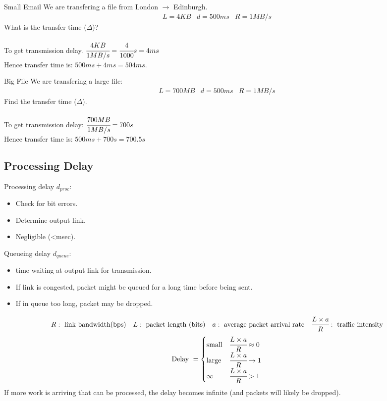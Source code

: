 \begin{examplebox}{Small Email}
    We are transfering a file from London $\to$ Edinburgh.
    \[\begin{matrix}
            L = 4KB & d = 500ms & R = 1MB/s
        \end{matrix}\]
    What is the transfer time ($\Delta$)?
    \\
    \\ To get transmission delay. $\cfrac{4KB}{1MB/s} = \cfrac{4}{1000}s = 4ms$
    \\ Hence transfer time is: $500ms + 4ms = 504ms$.
\end{examplebox}
\begin{examplebox}{Big File}
    We are transfering a large file:
    \[\begin{matrix}
            L = 700MB & d = 500ms & R = 1MB/s
        \end{matrix}\]
    Find the transfer time ($\Delta$).
    \\
    \\ To get transmission delay: $\cfrac{700MB}{1MB/s} = 700s$
    \\ Hence transfer time is: $500ms + 700s = 700.5s$
\end{examplebox}

\subsection{Processing Delay}
Processing delay $d_{proc}$:
\begin{itemize}
    \setlength\itemsep{0em}
    \item Check for bit errors.
    \item Determine output link.
    \item Negligible (<msec).
\end{itemize}
Queueing delay $d_{queue}$:
\begin{itemize}
    \setlength\itemsep{0em}
    \item time waiting at output link for transmission.
    \item If link is congested, packet might be queued for a long time before being sent.
    \item If in queue too long, packet may be dropped.
\end{itemize}
\[\begin{matrix}
        R: \text{ link bandwidth(bps)} & L: \text{ packet length (bits)} & a: \text{ average packet arrival rate} & \cfrac{L \times a}{R}: \text{ traffic intensity} \\
    \end{matrix}\]
\[\text{Delay } = \begin{cases}
        \text{small} & \cfrac{L \times a}{R} \approx 0 \\
        \text{large} & \cfrac{L \times a}{R} \to 1     \\
        \infty       & \cfrac{L \times a}{R} > 1       \\
    \end{cases}\]
If more work is arriving that can be processed, the delay becomes infinite (and packets will likely be dropped).
